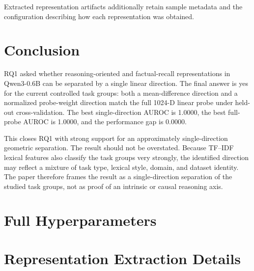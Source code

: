 \documentclass[11pt]{article}
\begin{document}
Extracted representation artifacts additionally retain sample metadata
and the configuration describing how each representation was obtained.



\section{Conclusion}

RQ1 asked whether reasoning-oriented and factual-recall representations in Qwen3-0.6B can be separated by a single linear direction. The final answer is yes for the current controlled task groups: both a mean-difference direction and a normalized probe-weight direction match the full 1024-D linear probe under held-out cross-validation. The best single-direction AUROC is 1.0000, the best full-probe AUROC is 1.0000, and the performance gap is 0.0000.

This closes RQ1 with strong support for an approximately single-direction geometric separation. The result should not be overstated. Because TF--IDF lexical features also classify the task groups very strongly, the identified direction may reflect a mixture of task type, lexical style, domain, and dataset identity. The paper therefore frames the result as a single-direction separation of the studied task groups, not as proof of an intrinsic or causal reasoning axis.





\appendix

\section{Full Hyperparameters}


\section{Representation Extraction Details}


\end{document}
